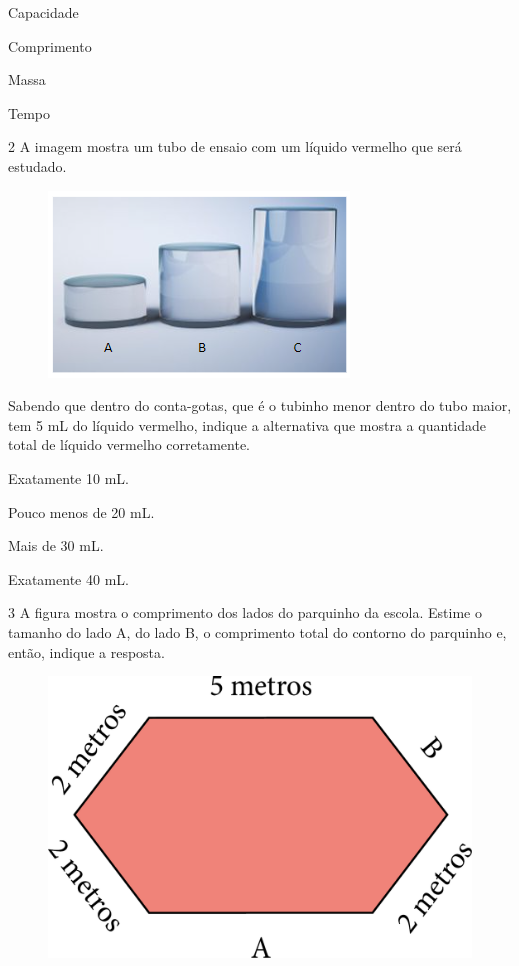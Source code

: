 \begin{escolha}
\item Capacidade

\item Comprimento

\item Massa

\item Tempo
\end{escolha}

\num{2} A imagem mostra um tubo de ensaio com um líquido vermelho que será estudado.


\begin{figure}[htpb!]
\centering
\includegraphics[width=.2\textwidth]{./media/image46.png}
\end{figure}

\pagebreak

Sabendo que dentro do conta-gotas, que é o tubinho menor dentro do tubo
maior, tem 5 mL do líquido vermelho, indique a alternativa que mostra a
quantidade total de líquido vermelho corretamente.

\begin{escolha}
\item Exatamente 10 mL.

\item Pouco menos de 20 mL.

\item Mais de 30 mL.

\item Exatamente 40 mL.
\end{escolha}

\num{3} A figura mostra o comprimento dos lados do parquinho da escola.
Estime o tamanho do lado A, do lado B, o comprimento total do contorno
do parquinho e, então, indique a resposta.

\begin{figure}[htpb!]
\centering
\includegraphics[width=.5\textwidth]{./media/image47.png}
\end{figure}

